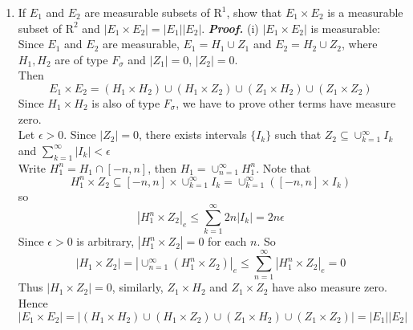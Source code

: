 \documentclass[a4paper,11pt]{article}
\begin{document}
\begin{enumerate}
\item If $E_1$ and $E_2$ are measurable subsets of $\mathrm{R}^1$, show that $E_1 \times E_2$ is a measurable subset of $\mathrm{R}^2$ and $\left| E_1 \times E_2 \right| = \left| E_1 \right| \left| E_2 \right|$.
\newline
\newline
\textit{\textbf {Proof.}}
\newline
(i) $|E_1 \times E_2|$ is measurable:
\newline
Since $E_1$ and $E_2$ are measurable, $E_1 = H_1 \cup Z_1$ and $E_2 = H_2 \cup Z_2$, where $H_1, H_2$ are of type $F_\sigma$ and $|Z_1| = 0$, $|Z_2| = 0$.\\
Then
$$E_1 \times E_2 = (H_1 \times H_2) \cup (H_1 \times Z_2) \cup (Z_1 \times H_2) \cup (Z_1 \times Z_2)$$
Since $H_1 \times H_2$ is also of type $F_\sigma$, we have to prove other terms have measure zero.\\
\newline
Let $\epsilon > 0$. Since $|Z_2| = 0$, there exists intervals $\{ I_k \}$ such that $Z_2 \subseteq \cup_{k = 1}^{\infty} I_k$ and $\sum_{k = 1}^{\infty} |I_k| < \epsilon$\\
Write $H_1^n = H_1 \cap [-n,n]$, then $H_1 = \cup_{n=1}^{\infty} H_1^n$. Note that
$$H_1^n \times Z_2 \subseteq [-n,n] \times \cup_{k=1}^{\infty} I_k = \cup_{k=1}^{\infty} ([-n,n] \times I_k)$$
so
$$|H_1^n \times Z_2|_e \leq \sum_{k=1}^{\infty} 2n|I_k| = 2n\epsilon$$
Since $\epsilon > 0$ is arbitrary, $|H_1^n \times Z_2| = 0$ for each $n$.
So
$$|H_1 \times Z_2| = |\cup_{n=1}^{\infty} (H_1^n \times Z_2)|_e \leq \sum_{n=1}^{\infty} |H_1^n \times Z_2|_e = 0$$
Thus $|H_1 \times Z_2| = 0$, similarly, $Z_1 \times H_2$ and $Z_1 \times Z_2$ have also measure zero.\\
Hence
$$|E_1 \times E_2| = |(H_1 \times H_2) \cup (H_1 \times Z_2) \cup (Z_1 \times H_2) \cup (Z_1 \times Z_2)| = |E_1||E_2|$$
\newline
\newline



\end{enumerate}
\end{document}
